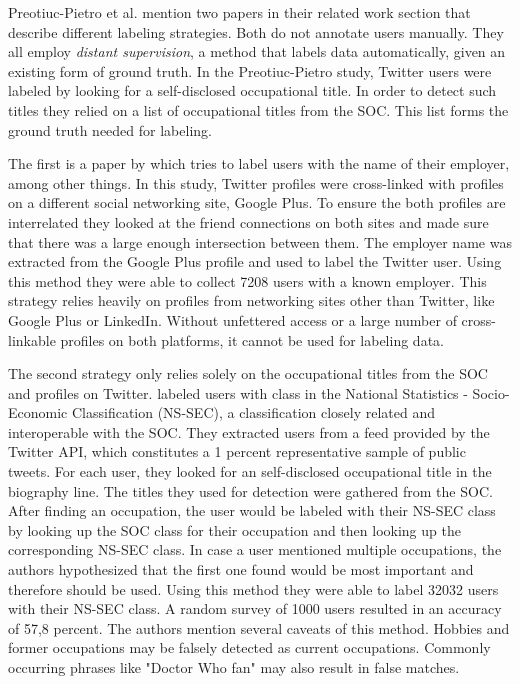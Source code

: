 \documentclass[
10pt, %
a4paper, %
oneside, %
headinclude,footinclude, %
] {book}%
\begin{document}
Preotiuc-Pietro et al. mention two papers in their related work section that describe different labeling strategies. Both do not annotate users manually. They all employ \textit{distant supervision}, a method that labels data automatically, given an existing form of ground truth. In the Preotiuc-Pietro study, Twitter users were labeled by looking for a self-disclosed occupational title. In order to detect such titles they relied on a list of occupational titles from the SOC. This list forms the ground truth needed for labeling.

The first is a paper by \citet{li} which tries to label users with the name of their employer, among other things. In this study, Twitter profiles were cross-linked with profiles on a different social networking site, Google Plus. To ensure the both profiles are interrelated they looked at the friend connections on both sites and made sure that there was a large enough intersection between them. The employer name was extracted from the Google Plus profile and used to label the Twitter user. Using this method they were able to collect 7208 users with a known employer. 
This strategy relies heavily on profiles from networking sites other than Twitter, like Google Plus or LinkedIn. Without unfettered access or a large number of cross-linkable profiles on both platforms, it cannot be used for labeling data.

The second strategy only relies solely on the occupational titles from the SOC and profiles on Twitter. \citet{sloan} labeled users with class in the National Statistics - Socio-Economic Classification (NS-SEC), a classification closely related and interoperable with the SOC. 
They extracted users from a feed provided by the Twitter API, which constitutes a 1 percent representative sample of public tweets. For each user, they looked for an self-disclosed occupational title in the biography line. The titles they used for detection were gathered from the SOC. After finding an occupation, the user would be labeled with their NS-SEC class by looking up the SOC class for their occupation and then looking up the corresponding NS-SEC class. In case a user mentioned multiple occupations, the authors hypothesized that the first one found would be most important and therefore should be used. 
Using this method they were able to label 32032 users with their NS-SEC class. A random survey of 1000 users resulted in an accuracy of 57,8 percent. The authors mention several caveats of this method. Hobbies and former occupations may be falsely detected as current occupations. Commonly occurring phrases like "Doctor Who fan" may also result in false matches.
\end{document}
